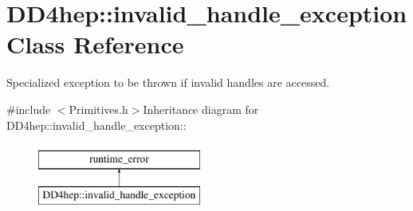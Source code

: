 \hypertarget{class_d_d4hep_1_1invalid__handle__exception}{
\section{DD4hep::invalid\_\-handle\_\-exception Class Reference}
\label{class_d_d4hep_1_1invalid__handle__exception}
}


Specialized exception to be thrown if invalid handles are accessed.  


{\ttfamily \#include $<$Primitives.h$>$}Inheritance diagram for DD4hep::invalid\_\-handle\_\-exception::\begin{figure}[H]
\begin{center}
\leavevmode
\includegraphics[height=2cm]{class_d_d4hep_1_1invalid__handle__exception}
\end{center}
\end{figure}
